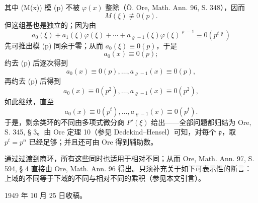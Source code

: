 \documentclass[11pt]{article}
\begin{document}
其中 (M(x)) 模 (p) 不被 \(\varphi(x)\) 整除（Ö. Ore, Math. Ann. 96, S. 348），因而
\[
M(\xi)\not\equiv0(p).
\]
但这组基也是独立的；因为由
\[
a_0(\xi)+a_1(\xi)\varphi(\xi)+\cdots+a_{\varrho-1}(\xi)\varphi(\xi)^{\varrho-1}
\equiv0(p^{t\varrho})
\]
先可推出模 (p) 同余于零；从而 \(a_0(\xi)\equiv0(p)\)，于是
\[
a_0(x)\equiv0(p);
\]
约去 (p) 后逐次得到
\[
a_0(x)\equiv0(p),\ldots,a_{\varrho-1}(x)\equiv0(p),
\]
再约去 (p) 后得到
\[
a_0(x)\equiv0(p^2),\ldots,a_{\varrho-1}(x)\equiv0(p^2),
\]
如此继续，直至
\[
a_0(x)\equiv0(p^t),\ldots,a_{\varrho-1}(x)\equiv0(p^t).
\]
于是，剩余类环的不同由多项式微分商 \(F'(\xi)\) 给出——全部问题都归结为 Ore, S. 345, § 3。由 Ore 定理 10（参见 Dedekind--Hensel）可知，对每个 \(\mathfrak p\)，取 \(p^t=p^n\) 已经足够；并且还可由 Ore 得到辅助数。

通过过渡到商环，所有这些同时也适用于相对不同；从而 Ore, Math. Ann. 97, S. 594, § 4 直接由 Ore, Math. Ann. 96 得出。只须补充关于如下可表示性的断言：上域的不同等于下域的不同与相对不同的乘积（参见本文引言）。

\begin{center}
1949 年 10 月 25 日收稿。
\end{center}
\end{document}

